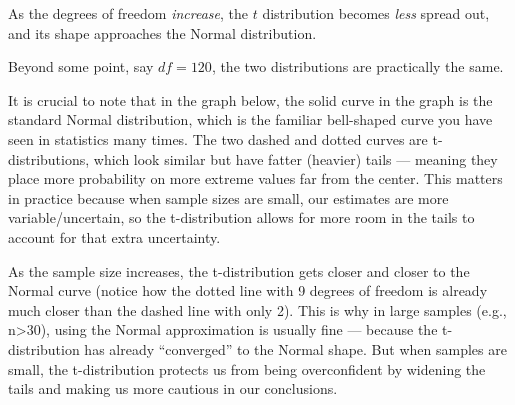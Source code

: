 \documentclass[
  letterpaper,
  DIV=11,
  numbers=noendperiod]{scrreprt}
\begin{document}
As the degrees of freedom \emph{increase}, the \(t\) distribution
becomes \emph{less} spread out, and its shape approaches the Normal
distribution.

Beyond some point, say \(df = 120\), the two distributions are
practically the same.

It is crucial to note that in the graph below, the solid curve in the
graph is the standard Normal distribution, which is the familiar
bell-shaped curve you have seen in statistics many times. The two dashed
and dotted curves are t-distributions, which look similar but have
fatter (heavier) tails --- meaning they place more probability on more
extreme values far from the center. This matters in practice because
when sample sizes are small, our estimates are more variable/uncertain,
so the t-distribution allows for more room in the tails to account for
that extra uncertainty.

As the sample size increases, the t-distribution gets closer and closer
to the Normal curve (notice how the dotted line with 9 degrees of
freedom is already much closer than the dashed line with only 2). This
is why in large samples (e.g., n\textgreater30), using the Normal
approximation is usually fine --- because the t-distribution has already
``converged'' to the Normal shape. But when samples are small, the
t-distribution protects us from being overconfident by widening the
tails and making us more cautious in our conclusions.
\end{document}
